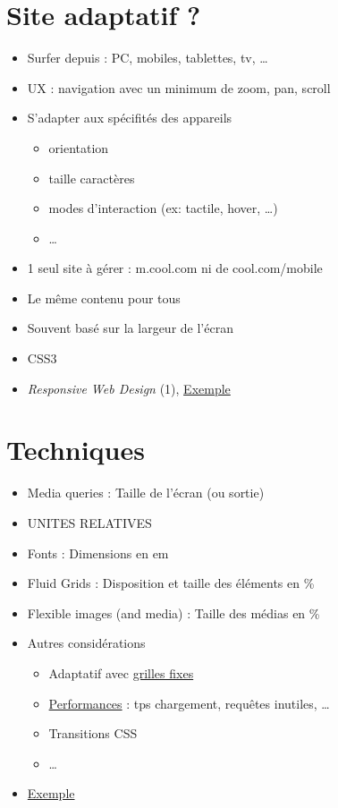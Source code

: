 \hypertarget{site-adaptatif}{%
\section{Site adaptatif ?}\label{site-adaptatif}}

\begin{itemize}
\tightlist
\item
  Surfer depuis : PC, mobiles, tablettes, tv, \ldots{}
\item
  UX : navigation avec un minimum de zoom, pan, scroll
\item
  S'adapter aux spécifités des appareils

  \begin{itemize}
  \tightlist
  \item
    orientation
  \item
    taille caractères
  \item
    modes d'interaction (ex: tactile, hover, \ldots)
  \item
    \ldots{}
  \end{itemize}
\item
  1 seul site à gérer : m.cool.com ni de cool.com/mobile
\item
  Le même contenu pour tous
\item
  Souvent basé sur la largeur de l'écran
\item
  CSS3
\item
  \emph{Responsive Web Design} (1),
  \href{https://alistapart.github.io/code-samples/responsive-web-design/ex/ex-site-FINAL.html}{Exemple}
\end{itemize}

\hypertarget{techniques}{%
\section{Techniques}\label{techniques}}

\begin{itemize}
\tightlist
\item
  Media queries : Taille de l'écran (ou sortie)
\item
  UNITES RELATIVES
\item
  Fonts : Dimensions en em
\item
  Fluid Grids : Disposition et taille des éléments en \%
\item
  Flexible images (and media) : Taille des médias en \%
\item
  Autres considérations

  \begin{itemize}
  \tightlist
  \item
    Adaptatif avec
    \href{https://blog.atolcd.com/adaptive-design-versus-responsive-design/}{grilles
    fixes}
  \item
    \href{https://browserdiet.com/}{Performances} : tps chargement,
    requêtes inutiles, \ldots{}
  \item
    Transitions CSS
  \item
    \ldots{}
  \end{itemize}
\item
  \href{https://webdesignerwall.com/tutorials/responsive-design-in-3-steps}{Exemple}
\end{itemize}

